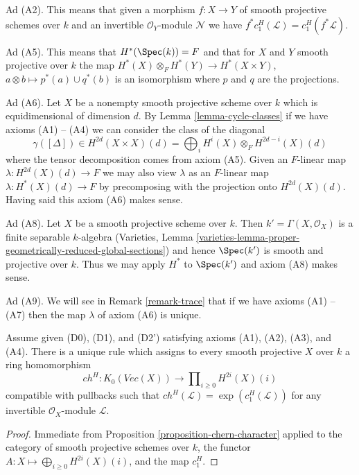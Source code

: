 \medskip\noindent
Ad (A2). This means that given a morphism $f : X \to Y$ of smooth projective
schemes over $k$ and an invertible $\mathcal{O}_Y$-module $\mathcal{N}$
we have $f^*c_1^H(\mathcal{L}) = c_1^H(f^*\mathcal{L})$.

\medskip\noindent
Ad (A5). This means that $H^*(\Spec(k)) = F$ and that for $X$ and $Y$ smooth
projective over $k$ the map $H^*(X) \otimes_F H^*(Y) \to H^*(X \times Y)$,
$a \otimes b \mapsto p^*(a) \cup q^*(b)$ is an isomorphism
where $p$ and $q$ are the projections.

\medskip\noindent
Ad (A6). Let $X$ be a nonempty smooth projective scheme over $k$
which is equidimensional of dimension $d$. By Lemma \ref{lemma-cycle-classes}
if we have axioms (A1) -- (A4) we can consider the class of the diagonal
$$
\gamma([\Delta]) \in
H^{2d}(X \times X)(d) = \bigoplus\nolimits_i H^i(X) \otimes_F H^{2d - i}(X)(d)
$$
where the tensor decomposition comes from axiom (A5).
Given an $F$-linear map $\lambda : H^{2d}(X)(d) \to F$ we may also view
$\lambda$ as an $F$-linear map $\lambda : H^*(X)(d) \to F$ by precomposing
with the projection onto $H^{2d}(X)(d)$. Having said this axiom (A6)
makes sense.

\medskip\noindent
Ad (A8). Let $X$ be a smooth projective scheme over $k$.
Then $k' = \Gamma(X, \mathcal{O}_X)$ is a finite separable
$k$-algebra (Varieties, Lemma
\ref{varieties-lemma-proper-geometrically-reduced-global-sections})
and hence $\Spec(k')$ is smooth and projective over $k$.
Thus we may apply $H^*$ to $\Spec(k')$ and axiom (A8) makes sense.

\medskip\noindent
Ad (A9). We will see in Remark \ref{remark-trace} that if we have
axioms (A1) -- (A7) then the map $\lambda$ of axiom (A6) is unique.

\begin{lemma}
\label{lemma-chern-classes}
Assume given (D0), (D1), and (D2') satisfying axioms (A1), (A2), (A3), and (A4).
There is a unique rule which assigns to every smooth projective $X$ over $k$
a ring homomorphism
$$
ch^H :
K_0(\textit{Vec}(X))
\longrightarrow
\prod\nolimits_{i \geq 0} H^{2i}(X)(i)
$$
compatible with pullbacks such that
$ch^H(\mathcal{L}) = \exp(c_1^H(\mathcal{L}))$
for any invertible $\mathcal{O}_X$-module $\mathcal{L}$.
\end{lemma}

\begin{proof}
Immediate from Proposition \ref{proposition-chern-character}
applied to the category of smooth projective schemes over $k$,
the functor $A : X \mapsto \bigoplus_{i \geq 0} H^{2i}(X)(i)$,
and the map $c_1^H$.
\end{proof}

